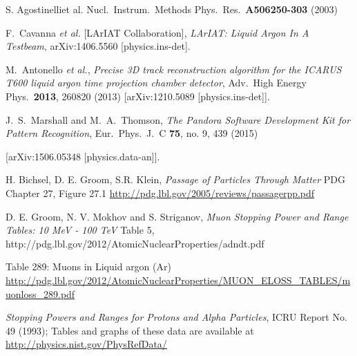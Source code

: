 \documentclass[a4paper,11pt]{article}
\begin{document}
\begin{thebibliography}{99}
  S. Agostinelliet al. Nucl.\ Instrum.\ Methods Phys.\ Res.\ {\bf A506250-303} (2003)


  F.~Cavanna {\it et al.} [LArIAT Collaboration],
  \textit{LArIAT: Liquid Argon In A Testbeam},
  arXiv:1406.5560 [physics.ins-det].





  M.~Antonello {\it et al.},
  \textit{Precise 3D track reconstruction algorithm for the ICARUS T600 liquid argon time projection chamber detector},
  Adv.\ High Energy Phys.\  {\bf 2013}, 260820 (2013)
  [arXiv:1210.5089 [physics.ins-det]].


  J.~S.~Marshall and M.~A.~Thomson,
  \textit{The Pandora Software Development Kit for Pattern Recognition},
  Eur.\ Phys.\ J.\ C {\bf 75}, no. 9, 439 (2015)

  [arXiv:1506.05348 [physics.data-an]].

  H. Bichsel, D. E. Groom, S.R. Klein, 
  \textit{Passage of Particles Through Matter} PDG Chapter 27, Figure 27.1 \url{http://pdg.lbl.gov/2005/reviews/passagerpp.pdf}

  D. E. Groom, N. V. Mokhov and S. Striganov,
  \textit{Muon Stopping Power and Range Tables: 10 MeV - 100 TeV} Table 5,
  http://pdg.lbl.gov/2012/AtomicNuclearProperties/adndt.pdf

 

   Table 289: Muons in Liquid argon (Ar) \url{http://pdg.lbl.gov/2012/AtomicNuclearProperties/MUON_ELOSS_TABLES/muonloss_289.pdf}

   \textit{Stopping Powers and Ranges for Protons and Alpha Particles}, ICRU Report No. 49 (1993); Tables and graphs of these data are available at \url{http://physics.nist.gov/PhysRefData/}


\end{thebibliography}
\end{document}
